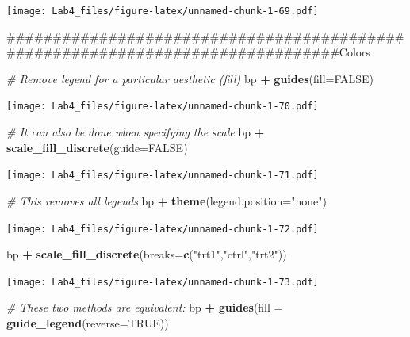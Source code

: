 \documentclass[]{article}
\newenvironment{Shaded}{\begin{snugshade}}{\end{snugshade}}
\newcommand{\KeywordTok}[1]{\textcolor[rgb]{0.13,0.29,0.53}{\textbf{#1}}}
\newcommand{\DataTypeTok}[1]{\textcolor[rgb]{0.13,0.29,0.53}{#1}}
\newcommand{\StringTok}[1]{\textcolor[rgb]{0.31,0.60,0.02}{#1}}
\newcommand{\CommentTok}[1]{\textcolor[rgb]{0.56,0.35,0.01}{\textit{#1}}}
\newcommand{\OtherTok}[1]{\textcolor[rgb]{0.56,0.35,0.01}{#1}}
\newcommand{\OperatorTok}[1]{\textcolor[rgb]{0.81,0.36,0.00}{\textbf{#1}}}
\newcommand{\NormalTok}[1]{#1}
\begin{document}
\texttt{[image: Lab4\_files/figure-latex/unnamed-chunk-1-69.pdf]}

\begin{Shaded}
\begin{Highlighting}[]
\NormalTok{###############################################################################Colors}

\CommentTok{# Remove legend for a particular aesthetic (fill)}
\NormalTok{bp }\OperatorTok{+}\StringTok{ }\KeywordTok{guides}\NormalTok{(}\DataTypeTok{fill=}\OtherTok{FALSE}\NormalTok{)}
\end{Highlighting}
\end{Shaded}

\texttt{[image: Lab4\_files/figure-latex/unnamed-chunk-1-70.pdf]}

\begin{Shaded}
\begin{Highlighting}[]
\CommentTok{# It can also be done when specifying the scale}
\NormalTok{bp }\OperatorTok{+}\StringTok{ }\KeywordTok{scale_fill_discrete}\NormalTok{(}\DataTypeTok{guide=}\OtherTok{FALSE}\NormalTok{)}
\end{Highlighting}
\end{Shaded}

\texttt{[image: Lab4\_files/figure-latex/unnamed-chunk-1-71.pdf]}

\begin{Shaded}
\begin{Highlighting}[]
\CommentTok{# This removes all legends}
\NormalTok{bp }\OperatorTok{+}\StringTok{ }\KeywordTok{theme}\NormalTok{(}\DataTypeTok{legend.position=}\StringTok{"none"}\NormalTok{)}
\end{Highlighting}
\end{Shaded}

\texttt{[image: Lab4\_files/figure-latex/unnamed-chunk-1-72.pdf]}

\begin{Shaded}
\begin{Highlighting}[]
\NormalTok{bp }\OperatorTok{+}\StringTok{ }\KeywordTok{scale_fill_discrete}\NormalTok{(}\DataTypeTok{breaks=}\KeywordTok{c}\NormalTok{(}\StringTok{"trt1"}\NormalTok{,}\StringTok{"ctrl"}\NormalTok{,}\StringTok{"trt2"}\NormalTok{))}
\end{Highlighting}
\end{Shaded}

\texttt{[image: Lab4\_files/figure-latex/unnamed-chunk-1-73.pdf]}

\begin{Shaded}
\begin{Highlighting}[]
\CommentTok{# These two methods are equivalent:}
\NormalTok{bp }\OperatorTok{+}\StringTok{ }\KeywordTok{guides}\NormalTok{(}\DataTypeTok{fill =} \KeywordTok{guide_legend}\NormalTok{(}\DataTypeTok{reverse=}\OtherTok{TRUE}\NormalTok{))}
\end{Highlighting}
\end{Shaded}
\end{document}
